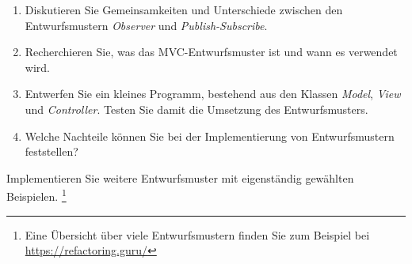 \documentclass[11pt, a4paper, oneside]{article}
\begin{document}
	\begin{enumerate}[label=\alph*)]
		\item Diskutieren Sie Gemeinsamkeiten und Unterschiede zwischen den Entwurfsmustern \emph{Observer} und \emph{Publish-Subscribe}.
		
		\lines[5cm]
		
		\item Recherchieren Sie, was das MVC-Entwurfsmuster ist und wann es verwendet wird.
		
		\lines[3cm]
		
		\item Entwerfen Sie ein kleines Programm, bestehend aus den Klassen \emph{Model}, \emph{View} und \emph{Controller}.
		Testen Sie damit die Umsetzung des Entwurfsmusters.
		
		\item Welche Nachteile können Sie bei der Implementierung von Entwurfsmustern feststellen?
		
		\lines[4cm]
	\end{enumerate}
	
	
	Implementieren Sie weitere Entwurfsmuster mit eigenständig gewählten Beispielen.
	\footnote{Eine Übersicht über viele Entwurfsmustern finden Sie zum Beispiel bei \url{https://refactoring.guru/}}
\end{document}
